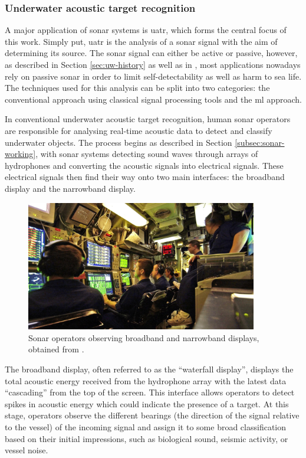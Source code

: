 \subsubsection{Underwater acoustic target recognition}\label{subsubsec:uatr-intro}

A major application of sonar systems is \acrfull{uatr}, which forms the central focus of this work. Simply put, \acrshort{uatr} is the analysis of a sonar signal with the aim of determining its source. The sonar signal can either be active or passive, however, as described in Section \ref{sec:uw-history} as well as in \cite{mishachandar_diverse_2021}, most applications nowadays rely on passive sonar in order to limit self-detectability as well as harm to sea life. The techniques used for this analysis can be split into two categories: the conventional approach using classical signal processing tools and the \acrfull{ml} approach.

In conventional underwater acoustic target recognition, human sonar operators are responsible for analysing real-time acoustic data to detect and classify underwater objects. The process begins as described in Section \ref{subsec:sonar-working}, with sonar systems detecting sound waves through arrays of hydrophones and converting the acoustic signals into electrical signals. These electrical signals then find their way onto two main interfaces: the broadband display and the narrowband display.

\begin{figure}[htbp]
    \centering
    \includegraphics[width=0.9\textwidth]{img/ch2/sonar_operator.png}
    \caption{Sonar operators observing broadband and narrowband displays, obtained from \cite{amick_how_2020}.}
    \label{fig:enter-label}
\end{figure}

The broadband display, often referred to as the ``waterfall display'', displays the total acoustic energy received from the hydrophone array with the latest data ``cascading'' from the top of the screen. This interface allows operators to detect spikes in acoustic energy which could indicate the presence of a target. At this stage, operators observe the different bearings (the direction of the signal relative to the vessel) of the incoming signal and assign it to some broad classification based on their initial impressions, such as biological sound, seismic activity, or vessel noise.

